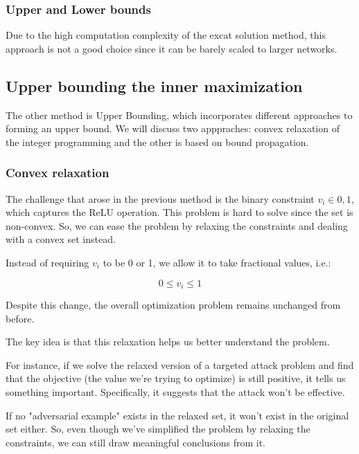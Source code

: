 \subsubsection{Upper and Lower bounds}

Due to the high computation complexity of the excat solution method, this approach is not a good choice since it can be barely scaled to larger networks. 

\subsection{Upper bounding the inner maximization}


The other method is Upper Bounding, which incorporates different approaches to forming an upper bound. We will discuss two apppraches: convex relaxation of the integer programming and the other 
is based on bound propagation.

\subsubsection{Convex relaxation}

The challenge that arose in the previous method is the binary constraint $v_i \in {0, 1}$, which 
captures the ReLU operation. This problem is hard to solve since the set is non-convex. 
So, we can ease the problem by relaxing the constraints and dealing with a convex set instead.

Instead of requiring $v_i$ to be 0 or 1, we allow it to take fractional values, i.e.:

\[ 0  \leq v_i \leq 1\]


Despite this change, the overall optimization problem remains unchanged from before.

The key idea is that this relaxation helps us better understand the problem. 

For instance, if we solve the relaxed version of a targeted attack problem and
find that the objective (the value we're trying to optimize) is still positive, 
it tells us something important. Specifically, it suggests that the attack won't be effective.


If no "adversarial example" exists in the relaxed set, it won't exist in the original 
set either. So, even though we've simplified the problem by relaxing the constraints, we 
can still draw meaningful conclusions from it.